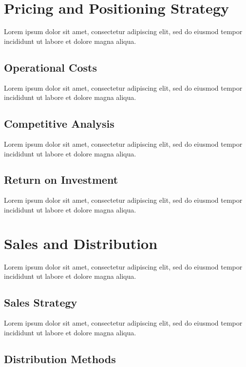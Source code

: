 
\section{Pricing and Positioning Strategy}

Lorem ipsum dolor sit amet, consectetur adipiscing elit, sed do eiusmod tempor incididunt ut labore et dolore magna aliqua.

\subsection{Operational Costs}

Lorem ipsum dolor sit amet, consectetur adipiscing elit, sed do eiusmod tempor incididunt ut labore et dolore magna aliqua.

\subsection{Competitive Analysis}

Lorem ipsum dolor sit amet, consectetur adipiscing elit, sed do eiusmod tempor incididunt ut labore et dolore magna aliqua.

\subsection{Return on Investment}

Lorem ipsum dolor sit amet, consectetur adipiscing elit, sed do eiusmod tempor incididunt ut labore et dolore magna aliqua.


\section{Sales and Distribution}

Lorem ipsum dolor sit amet, consectetur adipiscing elit, sed do eiusmod tempor incididunt ut labore et dolore magna aliqua.

\subsection{Sales Strategy}

Lorem ipsum dolor sit amet, consectetur adipiscing elit, sed do eiusmod tempor incididunt ut labore et dolore magna aliqua.

\subsection{Distribution Methods}

